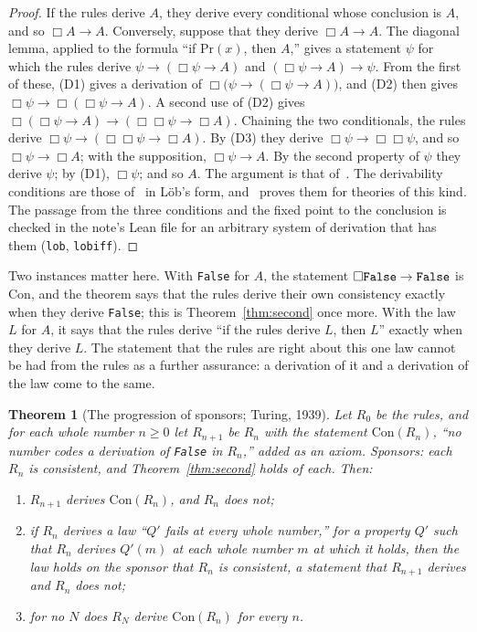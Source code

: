 \documentclass[11pt]{article}
\newtheorem{theorem}{Theorem}[section]
\theoremstyle{definition}
\theoremstyle{remark}
\DeclareRobustCommand{\lean}[1]{{\renewcommand{\_}{\textunderscore\allowbreak}\texttt{#1}}}
\newcommand{\False}{\lean{False}}
\begin{document}
\begin{proof}
If the rules derive $A$, they derive every conditional whose conclusion is $A$, and so $\Box A\to A$. Conversely, suppose that they derive $\Box A\to A$. The diagonal lemma, applied to the formula ``if $\mathrm{Pr}(x)$, then $A$,'' gives a statement $\psi$ for which the rules derive $\psi\to(\Box\psi\to A)$ and $(\Box\psi\to A)\to\psi$. From the first of these, (D1) gives a derivation of $\Box\bigl(\psi\to(\Box\psi\to A)\bigr)$, and (D2) then gives $\Box\psi\to\Box(\Box\psi\to A)$. A second use of (D2) gives $\Box(\Box\psi\to A)\to(\Box\Box\psi\to\Box A)$. Chaining the two conditionals, the rules derive $\Box\psi\to(\Box\Box\psi\to\Box A)$. By (D3) they derive $\Box\psi\to\Box\Box\psi$, and so $\Box\psi\to\Box A$; with the supposition, $\Box\psi\to A$. By the second property of $\psi$ they derive $\psi$; by (D1), $\Box\psi$; and so $A$. The argument is that of~\citet{lob}. The derivability conditions are those of~\citet{hilbertbernays} in L\"ob's form, and~\citet{smorynski} proves them for theories of this kind. The passage from the three conditions and the fixed point to the conclusion is checked in the note's Lean file for an arbitrary system of derivation that has them (\lean{lob}, \lean{lob\_iff}).
\end{proof}

\noindent Two instances matter here. With \False{} for $A$, the statement $\Box\False\to\False$ is $\mathrm{Con}$, and the theorem says that the rules derive their own consistency exactly when they derive \False; this is Theorem~\ref{thm:second} once more. With the law $L$ for $A$, it says that the rules derive ``if the rules derive $L$, then $L$'' exactly when they derive $L$. The statement that the rules are right about this one law cannot be had from the rules as a further assurance: a derivation of it and a derivation of the law come to the same.

\begin{theorem}[The progression of sponsors; Turing, 1939]\label{thm:ladder}
Let $R_0$ be the rules, and for each whole number $n\ge0$ let $R_{n+1}$ be $R_n$ with the statement $\mathrm{Con}(R_n)$, ``no number codes a derivation of \False{} in $R_n$,'' added as an axiom. Sponsors: each $R_n$ is consistent, and Theorem~\ref{thm:second} holds of each. Then:
\begin{enumerate}[leftmargin=2em,itemsep=1pt]
\item $R_{n+1}$ derives $\mathrm{Con}(R_n)$, and $R_n$ does not;
\item if $R_n$ derives a law ``$Q'$ fails at every whole number,'' for a property $Q'$ such that $R_n$ derives $Q'(m)$ at each whole number $m$ at which it holds, then the law holds on the sponsor that $R_n$ is consistent, a statement that $R_{n+1}$ derives and $R_n$ does not;
\item for no $N$ does $R_N$ derive $\mathrm{Con}(R_n)$ for every $n$.
\end{enumerate}
\end{theorem}
\end{document}
